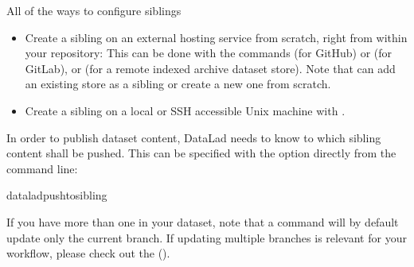 \begin{findoutmore}[label={index-2}, before title={\thetcbcounter\ }, check odd page=true]{All of the ways to configure siblings}
\begin{itemize}
\item {} 
\sphinxAtStartPar
Create a sibling on an external hosting service from scratch, right from
within your repository:
This can be done with the commands  (for GitHub)
or  (for GitLab), or
 (for a remote indexed archive dataset store).
Note that  can add an existing store as a sibling
or create a new one from scratch.

\item {} 
\sphinxAtStartPar
Create a sibling on a local or SSH accessible Unix machine with
.

\end{itemize}


\end{findoutmore}

\sphinxAtStartPar
In order to publish dataset content, DataLad needs to know to which sibling
content shall be pushed. This can be specified with the  option directly
from the command line:

\begin{sphinxVerbatim}[commandchars=\\\{\}]
dataladpush\PYGZhy{}\PYGZhy{}to\PYGZlt{}sibling\PYGZgt{}
\end{sphinxVerbatim}

\sphinxAtStartPar
If you have more than one {\hyperref[\detokenize{glossary:term-branch}]{}} in your dataset, note that a
 command will by default update only the current branch.
If updating multiple branches is relevant for your workflow, please check out
the {\hyperref[\detokenize{basics/101-141-push:fom-push-branch}]{}} ().

